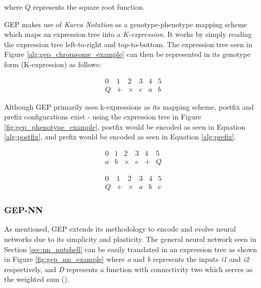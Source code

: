 \noindent where $Q$ represents the square root function. \bigskip

\noindent GEP makes use of \textit{Karva Notation} as a genotype-phenotype mapping scheme which maps an expression tree into a \textit{K-expression}. It works by simply reading the expression tree left-to-right and top-to-bottom. The expression tree seen in Figure \ref{alg:gep_chromsome_example} can then be represented in its genotype form (K-expression) as follows:

\begin{equation}
    \begin{array}{cccccc}
        0 & 1 & 2 & 3 & 4 & 5\\
        Q & + & \times & c & a & b
    \end{array}
\end{equation}
  
\noindent Although GEP primarily uses k-expressions as its mapping scheme, postfix and prefix configurations exist - using the expression tree in Figure \ref{fig:gep_phenotype_example}, postfix would be encoded as seen in Equation \ref{alg:postfix}, and prefix would be encoded as seen in Equation \ref{alg:prefix}.

\begin{equation}\label{alg:postfix}
    \begin{array}{cccccc}
        0 & 1 & 2 & 3 & 4 & 5\\
        a & b & \times & c & + & Q
    \end{array}
\end{equation}

\begin{equation}\label{alg:prefix}
    \begin{array}{cccccc}
        0 & 1 & 2 & 3 & 4 & 5\\
        Q & + & \times & a & b & c
    \end{array}
\end{equation}

\subsubsection{GEP-NN}
\noindent As mentioned, GEP extends its methodology to encode and evolve neural networks due to its simplicity and plasticity. The general neural network seen in Section \ref{sec:nn_nutshell} can be easily translated in an expression tree as shown in Figure \ref{fig:gep_nn_example} where \textit{a} and \textit{b} represents the inputs \textit{i1} and \textit{i2} respectively, and \textit{D} represents a function with connectivity two which serves as the weighted sum (\cite{ferreira2006gene}).

